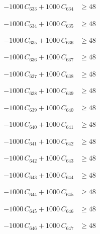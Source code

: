 \documentclass[a4paper,11pt]{article}
\begin{document}
\begin{align}
-1000\,C_{633} + 1000\,C_{634} &\geq 48 \nonumber
\end{align}

\begin{align}
-1000\,C_{634} + 1000\,C_{635} &\geq 48 \nonumber
\end{align}

\begin{align}
-1000\,C_{635} + 1000\,C_{636} &\geq 48 \nonumber
\end{align}

\begin{align}
-1000\,C_{636} + 1000\,C_{637} &\geq 48 \nonumber
\end{align}

\begin{align}
-1000\,C_{637} + 1000\,C_{638} &\geq 48 \nonumber
\end{align}

\begin{align}
-1000\,C_{638} + 1000\,C_{639} &\geq 48 \nonumber
\end{align}

\begin{align}
-1000\,C_{639} + 1000\,C_{640} &\geq 48 \nonumber
\end{align}

\begin{align}
-1000\,C_{640} + 1000\,C_{641} &\geq 48 \nonumber
\end{align}

\begin{align}
-1000\,C_{641} + 1000\,C_{642} &\geq 48 \nonumber
\end{align}

\begin{align}
-1000\,C_{642} + 1000\,C_{643} &\geq 48 \nonumber
\end{align}

\begin{align}
-1000\,C_{643} + 1000\,C_{644} &\geq 48 \nonumber
\end{align}

\begin{align}
-1000\,C_{644} + 1000\,C_{645} &\geq 48 \nonumber
\end{align}

\begin{align}
-1000\,C_{645} + 1000\,C_{646} &\geq 48 \nonumber
\end{align}

\begin{align}
-1000\,C_{646} + 1000\,C_{647} &\geq 48 \nonumber
\end{align}
\end{document}
